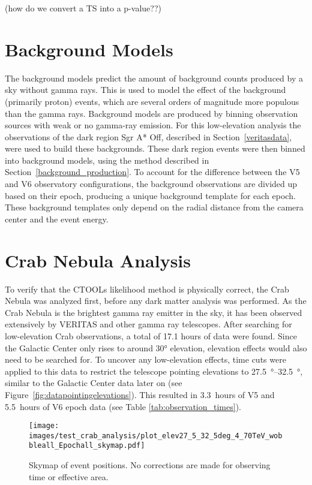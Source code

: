   {\color{red}(how do we convert a TS into a p-value??)}
  

\section{Background Models}\label{sec:bkgmodels}
  The background models predict the amount of background counts produced by a sky without gamma rays.
  This is used to model the effect of the background (primarily proton) events, which are several orders of magnitude more populous than the gamma rays.
  Background models are produced by binning observation sources with weak or no gamma-ray emission.
  For this low-elevation analysis the observations of the dark region Sgr A* Off, described in Section~\ref{veritasdata}, were used to build these backgrounds.
  These dark region events were then binned into background models, using the method described in Section~\ref{background_production}.
  To account for the difference between the V5 and V6 observatory configurations, the background observations are divided up based on their epoch, producing a unique background template for each epoch.
  These background templates only depend on the radial distance from the camera center and the event energy.

\section{Crab Nebula Analysis}\label{sec:crab_analysis}
  To verify that the CTOOLs likelihood method is physically correct, the Crab Nebula was analyzed first, before any dark matter analysis was performed.
  As the Crab Nebula is the brightest gamma ray emitter in the sky, it has been observed extensively by VERITAS and other gamma ray telescopes.
  After searching for low-elevation Crab observations, a total of 17.1 hours of data were found.
  Since the Galactic Center only rises to around \ang{30} elevation, elevation effects would also need to be searched for.
  To uncover any low-elevation effects, time cuts were applied to this data to restrict the telescope pointing elevations to \SIrange{27.5}{32.5}{\degree}, similar to the Galactic Center data later on (see Figure~\ref{fig:datapointingelevations}).
  This resulted in \SI{3.3}{hours} of V5 and \SI{5.5}{hours} of V6 epoch data (see Table \ref{tab:observation_times}).
    
  \begin{figure}[h]
    \centering
    \texttt{[image: images/test\_crab\_analysis/plot\_elev27\_5\_32\_5deg\_4\_70TeV\_wobbleall\_Epochall\_skymap.pdf]}
    \caption[Crab Counts Skymap]
    {
      Skymap of event positions.
      No corrections are made for observing time or effective area.
    }
    \label{fig:crab_skymap}
  \end{figure}
  
